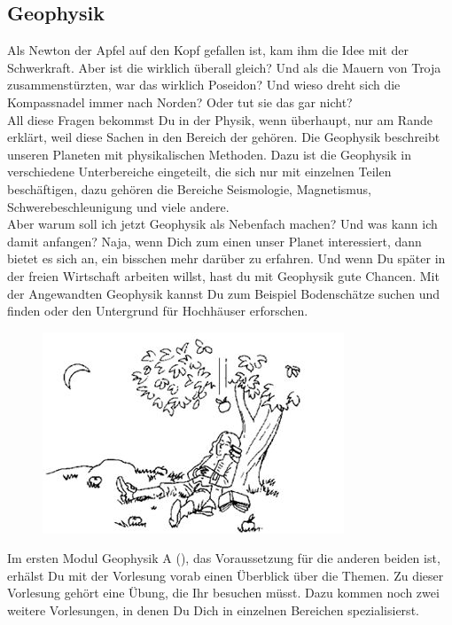 \subsection{Geophysik}


Als Newton der Apfel auf den Kopf gefallen ist, kam ihm die Idee mit der Schwerkraft.
Aber ist die wirklich überall gleich?
Und als die Mauern von Troja zusammenstürzten, war das wirklich Poseidon?
Und wieso dreht sich die Kompassnadel immer nach Norden?
Oder tut sie das gar nicht?\\
All diese Fragen bekommst Du in der Physik, wenn überhaupt, nur am Rande erklärt, weil diese Sachen in den Bereich der
 gehören.
Die Geophysik beschreibt unseren Planeten mit physikalischen Methoden.
Dazu ist die Geophysik in verschiedene Unterbereiche eingeteilt, die sich nur mit einzelnen Teilen beschäftigen, dazu gehören die Bereiche
Seismologie, Magnetismus, Schwerebeschleunigung und viele andere.\\
Aber warum soll ich jetzt Geophysik als Nebenfach machen? Und was kann ich damit anfangen?
Naja, wenn Dich zum einen unser Planet interessiert, dann bietet es sich an, ein bisschen mehr darüber zu erfahren.
Und wenn Du später in der freien Wirtschaft arbeiten willst, hast du mit Geophysik gute Chancen.
Mit der Angewandten Geophysik kannst Du zum Beispiel Bodenschätze suchen und finden oder den Untergrund für Hochhäuser erforschen.\\
%
\begin{figure}[!h]
 \begin{center}
  \includegraphics[width=.6\textwidth]{bilder/newton.jpg}
 \end{center}
\end{figure}
%
Im ersten Modul Geophysik A (), das Voraussetzung für die anderen beiden ist, erhälst Du mit der Vorlesung
 vorab einen Überblick über die Themen.
Zu dieser Vorlesung gehört eine Übung, die Ihr besuchen müsst.
Dazu kommen noch zwei weitere Vorlesungen, in denen Du Dich in einzelnen Bereichen spezialisierst.
